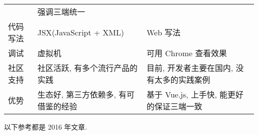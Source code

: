 \begin{longtable}[]{@{}lll@{}}
\begin{minipage}[t]{0.30\columnwidth}
\end{minipage} & \begin{minipage}[t]{0.30\columnwidth}\raggedright\strut
强调三端统一\strut
\end{minipage}\tabularnewline
\begin{minipage}[t]{0.30\columnwidth}\raggedright\strut
代码写法\strut
\end{minipage} & \begin{minipage}[t]{0.30\columnwidth}\raggedright\strut
JSX(JavaScript + XML)\strut
\end{minipage} & \begin{minipage}[t]{0.30\columnwidth}\raggedright\strut
Web 写法\strut
\end{minipage}\tabularnewline
\begin{minipage}[t]{0.30\columnwidth}\raggedright\strut
调试\strut
\end{minipage} & \begin{minipage}[t]{0.30\columnwidth}\raggedright\strut
虚拟机\strut
\end{minipage} & \begin{minipage}[t]{0.30\columnwidth}\raggedright\strut
可用 Chrome 查看效果\strut
\end{minipage}\tabularnewline
\begin{minipage}[t]{0.30\columnwidth}\raggedright\strut
社区支持\strut
\end{minipage} & \begin{minipage}[t]{0.30\columnwidth}\raggedright\strut
社区活跃, 有多个流行产品的实践\strut
\end{minipage} & \begin{minipage}[t]{0.30\columnwidth}\raggedright\strut
目前, 开发者主要在国内, 没有太多的实践案例\strut
\end{minipage}\tabularnewline
\begin{minipage}[t]{0.30\columnwidth}\raggedright\strut
优势\strut
\end{minipage} & \begin{minipage}[t]{0.30\columnwidth}\raggedright\strut
生态好, 第三方依赖多, 有可借鉴的经验\strut
\end{minipage} & \begin{minipage}[t]{0.30\columnwidth}\raggedright\strut
基于 Vue.js, 上手快, 能更好的保证三端一致\strut
\end{minipage}\tabularnewline
\bottomrule
\end{longtable}

以下参考都是 2016 年文章.

